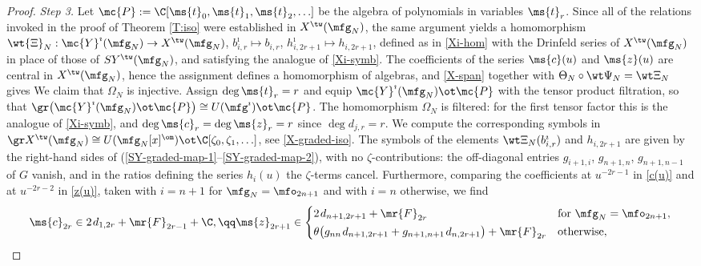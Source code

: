 \documentclass{amsart}
\numberwithin{equation}{section}
\theoremstyle{remark}
\renewcommand{\,}{\kern 0.1em} %
\begin{document}
\begin{proof}
\smallskip

{\it \noindent Step 3.} Let $\mc{P} := \C[\ms{t}_0, \ms{t}_1, \ms{t}_2, \ldots]$ be the algebra of polynomials in variables $\ms{t}_r$. Since all of the relations invoked in the proof of Theorem \ref{T:iso} were established in $X^\tw(\mfg_N)$, the same argument yields a homomorphism $\wt{\Xi}_N : \mc{Y}^{\imath}(\mfg_N) \to X^{\tw}(\mfg_N)$, $b^{\imath}_{i,r} \mapsto b_{i,r}$, $h^{\imath}_{i,2r+1} \mapsto h_{i,2r+1}$, defined as in \eqref{Xi-hom} with the Drinfeld series of $X^{\tw}(\mfg_N)$ in place of those of $SY^{\tw}(\mfg_N)$, and satisfying the analogue of \eqref{Xi-symb}. The coefficients of the series $\ms{c}(u)$ and $\ms{z}(u)$ are central in $X^\tw(\mfg_N)$, hence the assignment
%
%
defines a homomorphism of algebras, and \eqref{X-span} together with $\Theta_N \circ \wt\Psi_N = \wt\Xi_N$ gives
%
\equ{
\Theta_N\big( \wt{\Psi}_N(y)\, m(\wh{\ms{c}}_{2r},  \wh{\ms z}_{2r+1}) \big) = \Omega_N\big( y \ot m(\ms{t}_{2r}, \ms{t}_{2r+1}) \big) .
\label{Th-Om}
}
%
We claim that $\Omega_N$ is injective. Assign $\deg \ms{t}_r = r$ and equip $\mc{Y}^{\imath}(\mfg_N) \ot \mc{P}$ with the tensor product filtration, so that $\gr \big( \mc{Y}^{\imath}(\mfg_N) \ot \mc{P} \big) \cong U(\mfg^{\imath}) \ot \mc{P}$. The homomorphism $\Omega_N$ is filtered: for the first tensor factor this is the analogue of \eqref{Xi-symb}, and $\deg \ms{c}_r = \deg \ms{z}_r = r$ since $\deg d_{j,r} = r$. We compute the corresponding symbols in $\gr X^\tw(\mfg_N) \cong U(\mfg_N[x]^{\om}) \ot \C[\zeta_0,\zeta_1,\ldots]$, see \eqref{X-graded-iso}. The symbols of the elements $\wt\Xi_N(b^{\imath}_{i,r})$ and $h_{i,2r+1}$ are given by the right-hand sides of (\ref{SY-graded-map-1}--\ref{SY-graded-map-2}), with no $\zeta$-contributions: the off-diagonal entries $g_{i+1,i}$, $g_{n+1,n}$, $g_{n+1,n-1}$ of $G$ vanish, and in the ratios defining the series $h_i(u)$ the $\zeta$-terms cancel. Furthermore, comparing the coefficients at $u^{-2r-1}$ in \eqref{c(u)} and at $u^{-2r-2}$ in \eqref{z(u)}, taken with $i=n+1$ for $\mfg_N = \mfo_{2n+1}$ and with $i=n$ otherwise, we find
\[
\ms{c}_{2r} \in 2\,d_{1,2r} + \mr{F}_{2r-1} + \C , \qq
\ms{z}_{2r+1} \in \begin{cases}
2\, d_{n+1,2r+1} + \mr{F}_{2r} & \text{for } \mfg_N = \mfo_{2n+1} , \\[0.2em]
\theta \big( g_{nn}\, d_{n+1,2r+1} + g_{n+1,n+1}\, d_{n,2r+1} \big) + \mr{F}_{2r} & \text{otherwise} ,

\end{cases}\]
\end{proof}
\end{document}
